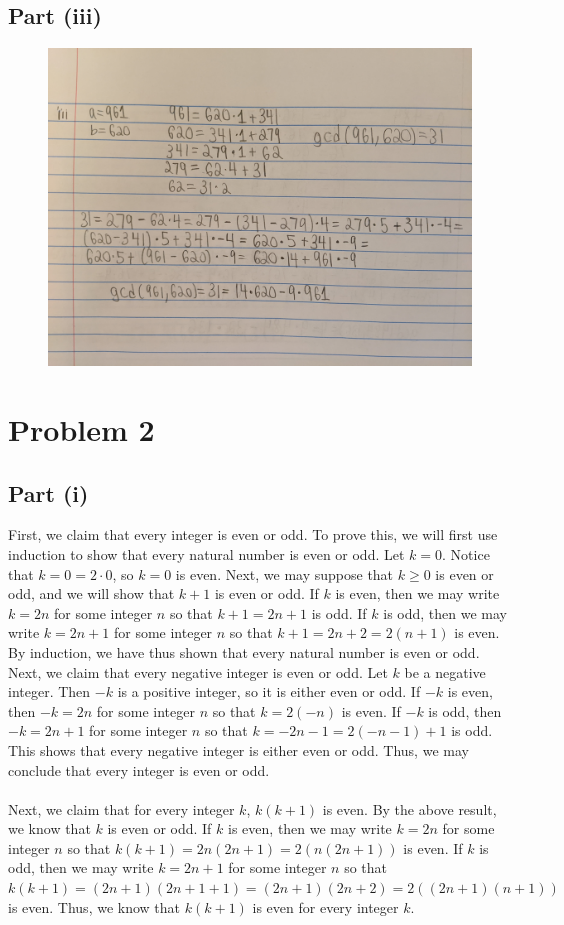 \documentclass[12pt]{article}
\begin{document}
\subsection*{Part (iii)}
 \begin{figure}[H]
\centering
\includegraphics[width=\textwidth]{Problem1Image3}
\end{figure}
\newpage
\section*{Problem 2}
\subsection*{Part (i)}
First, we claim that every integer is even or odd. To prove this, we will first use induction to show that every natural number is even or odd. Let $k = 0$. Notice that $k = 0 = 2\cdot 0$, so $k=0$ is even. Next, we may suppose that $k\geq 0$ is even or odd, and we will show that $k+1$ is even or odd. If $k$ is even, then we may write $k=2n$ for some integer $n$ so that $k+1 = 2n+1$ is odd. If $k$ is odd, then we may write $k = 2n+1$ for some integer $n$ so that $k+1 = 2n+2 = 2(n+1)$ is even. By induction, we have thus shown that every natural number is even or odd. Next, we claim that every negative integer is even or odd. Let $k$ be a negative integer. Then $-k$ is a positive integer, so it is either even or odd. If $-k$ is even, then $-k = 2n$ for some integer $n$ so that $k= 2(-n)$ is even. If $-k$ is odd, then $-k = 2n+1$ for some integer $n$ so that $k = -2n - 1 = 2(-n-1)+1$ is odd. This shows that every negative integer is either even or odd. Thus, we may conclude that every integer is even or odd.
\\ \\
Next, we claim that for every integer $k$, $k(k+1)$ is even. By the above result, we know that $k$ is even or odd. If $k$ is even, then we may write $k = 2n$ for some integer $n$ so that $k(k+1) = 2n(2n+1)= 2(n(2n+1))$ is even. If $k$ is odd, then we may write $k = 2n+1$ for some integer $n$ so that $k(k+1) = (2n+1)(2n+1+1) = (2n+1)(2n+2) = 2((2n+1)(n+1))$ is even. Thus, we know that $k(k+1)$ is even for every integer $k$.
\newpage
\end{document}
